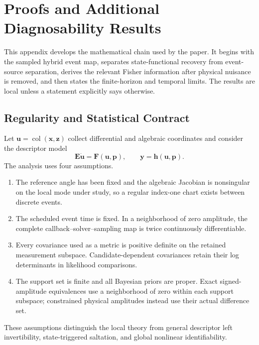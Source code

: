 \section{Proofs and Additional Diagnosability Results}
\label{app:theory}

This appendix develops the mathematical chain used by the paper. It begins with the sampled hybrid event map, separates state-functional recovery from event-source separation, derives the relevant Fisher information after physical nuisance is removed, and then states the finite-horizon and temporal limits. The results are local unless a statement explicitly says otherwise.

\subsection{Regularity and Statistical Contract}

Let $\bm u=\operatorname{col}(\bm x,\bm z)$ collect differential and algebraic coordinates and consider the descriptor model
\begin{equation}
 \bm E\dot{\bm u}=\bm F(\bm u,\bm p),
 \qquad \bm y=\bm h(\bm u,\bm p).
 \label{eq:supp-descriptor}
\end{equation}
The analysis uses four assumptions.

\begin{enumerate}
\item The reference angle has been fixed and the algebraic Jacobian is nonsingular on the local mode under study, so a regular index-one chart exists between discrete events.
\item The scheduled event time is fixed. In a neighborhood of zero amplitude, the complete callback--solver--sampling map is twice continuously differentiable.
\item Every covariance used as a metric is positive definite on the retained measurement subspace. Candidate-dependent covariances retain their log determinants in likelihood comparisons.
\item The support set is finite and all Bayesian priors are proper. Exact signed-amplitude equivalences use a neighborhood of zero within each support subspace; constrained physical amplitudes instead use their actual difference set.
\end{enumerate}

These assumptions distinguish the local theory from general descriptor left invertibility, state-triggered saltation, and global nonlinear identifiability.

